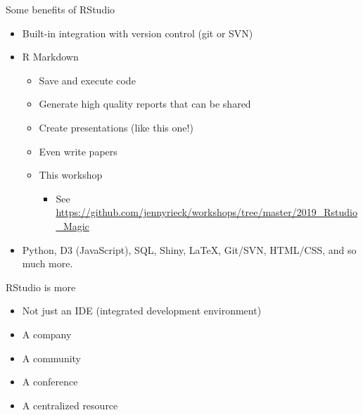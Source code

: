 \documentclass[ignorenonframetext,]{beamer}
\providecommand{\tightlist}{%
  \setlength{\itemsep}{0pt}\setlength{\parskip}{0pt}}
\begin{document}
\begin{frame}{Some benefits of RStudio}
\protect\hypertarget{some-benefits-of-rstudio}{}

\begin{itemize}
\tightlist
\item
  Built-in integration with version control (git or SVN)
\item
  R Markdown

  \begin{itemize}
  \tightlist
  \item
    Save and execute code
  \item
    Generate high quality reports that can be shared
  \item
    Create presentations (like this one!)
  \item
    Even write papers
  \item
    This workshop

    \begin{itemize}
    \tightlist
    \item
      See
      \url{https://github.com/jennyrieck/workshops/tree/master/2019_Rstudio_Magic}
    \end{itemize}
  \end{itemize}
\item
  Python, D3 (JavaScript), SQL, Shiny, LaTeX, Git/SVN, HTML/CSS, and so
  much more.
\end{itemize}

\end{frame}

\begin{frame}{RStudio is more}
\protect\hypertarget{rstudio-is-more}{}

\begin{itemize}
\tightlist
\item
  Not just an IDE (integrated development environment)
\item
  A company
\item
  A community
\item
  A conference
\item
  A centralized resource
\end{itemize}

\end{frame}
\end{document}

